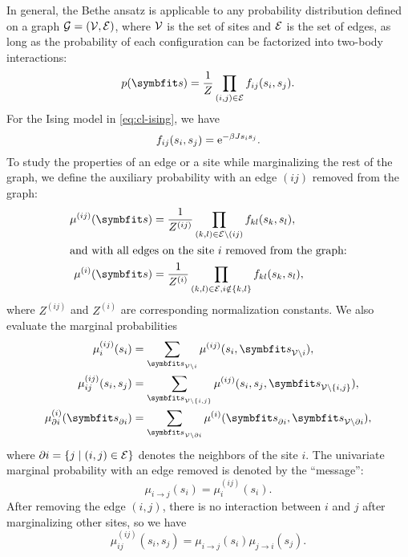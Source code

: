 In general, the Bethe ansatz is applicable to any probability distribution defined on a graph $\mathcal{G} = (\mathcal{V}, \mathcal{E})$, where $\mathcal{V}$ is the set of sites and $\mathcal{E}$ is the set of edges, as long as the probability of each configuration can be factorized into two-body interactions:
\begin{equation}
p(\vs) = \frac{1}{Z} \prod_{(i, j) \in \calE} f_{i j}(s_i, s_j).
\end{equation}
For the Ising model in \cref{eq:cl-ising}, we have
\begin{equation}
f_{i j}(s_i, s_j) = \mathrm{e}^{-\beta J s_i s_j}.
\end{equation}
To study the properties of an edge or a site while marginalizing the rest of the graph, we define the auxiliary probability with an edge $(i j)$ removed from the graph:
\begin{align}
\mu^{(i j)}(\vs) &= \frac{1}{Z^{(i j)}} \prod_{(k, l) \in \calE \setminus (i j)} f_{k l}(s_k, s_l), \\
\shortintertext{and with all edges on the site $i$ removed from the graph:}
\mu^{(i)}(\vs) &= \frac{1}{Z^{(i)}} \prod_{(k, l) \in \calE, i \notin \{k, l\}} f_{k l}(s_k, s_l),
\end{align}
where $Z^{(i j)}$ and $Z^{(i)}$ are corresponding normalization constants. We also evaluate the marginal probabilities
\begin{align}
\mu^{(i j)}_i(s_i) &= \sum_{\vs_{\calV \setminus i}} \mu^{(i j)}(s_i, \vs_{\calV \setminus i}), \\
\mu^{(i j)}_{i j}(s_i, s_j) &= \sum_{\vs_{\calV \setminus \{i, j\}}} \mu^{(i j)}(s_i, s_j, \vs_{\calV \setminus \{i, j\}}), \\
\mu^{(i)}_{\partial i}(\vs_{\partial i}) &= \sum_{\vs_{\calV \setminus \partial i}} \mu^{(i)}(\vs_{\partial i}, \vs_{\calV \setminus \partial i}),
\end{align}
where $\partial i = \left\{ j \mid (i, j) \in \mathcal{E} \right\}$ denotes the neighbors of the site $i$. The univariate marginal probability with an edge removed is denoted by the ``message'':
\begin{equation}
\mu_{i \to j}(s_i) = \mu^{(i j)}_i(s_i).
\end{equation}
After removing the edge $(i, j)$, there is no interaction between $i$ and $j$ after marginalizing other sites, so we have
\begin{equation}
\mu^{(i j)}_{i j}(s_i, s_j) = \mu_{i \to j}(s_i) \mu_{j \to i}(s_j).
\end{equation}

